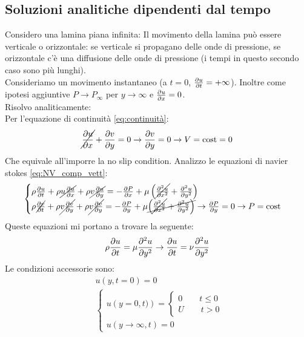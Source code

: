 \subsection{Soluzioni analitiche dipendenti dal tempo}
Considero una lamina piana infinita:
Il movimento della lamina può essere verticale o orizzontale: se verticale si propagano delle onde di pressione, se orizzontale c'è una diffusione delle onde di pressione (i tempi in questo secondo caso sono più lunghi).\\
Consideriamo un movimento instantaneo (a $ t = 0 $, $ \frac{\partial u}{\partial t} = + \infty$).
Inoltre come ipotesi aggiuntive $ P \to P_ \infty $ per $ y \to \infty $ e $ \frac{\partial u}{\partial x}=0 $.\\
Risolvo analiticamente:\\
Per l'equazione di continuità \cref{eq:continuità}:
\[
  \cancel{\frac{\partial u}{\partial x}} + \frac{\partial v}{\partial y} = 0 \rightarrow \frac{\partial v}{\partial y}=0 \rightarrow V =\operatorname{cost} = 0   
\]
Che equivale all'imporre la no slip condition. 
Analizzo le equazioni di navier stokes \cref{eq:NV_comp_vett}:
\begin{equation*}
  \begin{cases}
	  \rho \frac{\partial u}{\partial t}+ \rho \cancel{u \frac{\partial u}{\partial x}} + \rho \cancel{v \frac{\partial u}{\partial y}} = - \frac{\partial P}{\partial x} + \mu \left(  \cancel{\frac{\partial^2u}{\partial x^2}} + \frac{\partial^2u}{\partial y^2}\right)  \\
	  \rho \cancel{\frac{\partial v}{\partial t}}+ \rho \cancel{v \frac{\partial v}{\partial y}} + \rho \cancel{v \frac{\partial v}{\partial y}} = - \frac{\partial P}{\partial y} + \mu \cancel{\left(  \cancel{\frac{\partial^2u}{\partial x^2}} + \frac{\partial^2u}{\partial y^2}\right)} \rightarrow \frac{\partial P}{\partial y} = 0 \rightarrow P = \operatorname{cost} 
  \end{cases}
\end{equation*}
Queste equazioni mi portano a trovare la seguente:
\[
  \rho \frac{\partial u}{\partial t}= \mu \frac{\partial^2u}{\partial y^2} \rightarrow \frac{\partial u}{\partial t} = \nu \frac{\partial^2u}{\partial y^2} 
\]
Le condizioni accessorie sono:
\begin{align*}
	&u \left( y,t=0 \right)=0\\
	&\begin{cases}
	  u \left(  y =0,t) \right) = 
	  \begin{cases}
	    0 \qquad t \leq 0\\
	    U \qquad t > 0 
	  \end{cases}\\
         u \left( y \to \infty,t \right)=0
	\end{cases}
\end{align*}
